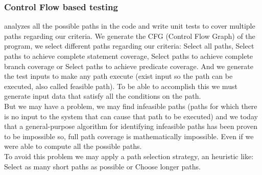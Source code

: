 \documentclass[10pt, conference, compsocconf]{IEEEtran}
\begin{document}
\subsubsection{Control Flow based testing} analyzes all the possible paths in the code and write unit tests to cover multiple paths regarding our criteria.
We generate the CFG (Control Flow Graph) of the program, we select different paths regarding our criteria:
Select all paths, Select paths to achieve complete statement coverage\cite{stt,Ntafos:1988:CST:630792.631017},
Select paths to achieve complete branch coverage\cite{Roper1994,stt}
or Select paths to achieve predicate coverage\cite{stt,Ntafos:1988:CST:630792.631017}.
And we generate the test inputs to make any path execute (exist input so the path can be executed, also called feasible path).
To be able to accomplish this we must generate input data that satisfy all the conditions on the path.\\
But we may have a problem, we may find infeasible paths (paths for which there is no input to the system that can cause that path to be executed)
and we today that a general-purpose algorithm for identifying infeasible paths has been proven to be impossible\cite{infeasible} so, full path coverage
is mathematically impossible. Even if we were able to compute all the possible paths.\\
To avoid this problem we may apply a path selection strategy, an heuristic like: Select as many short paths as possible or Choose longer paths.

\end{document}

